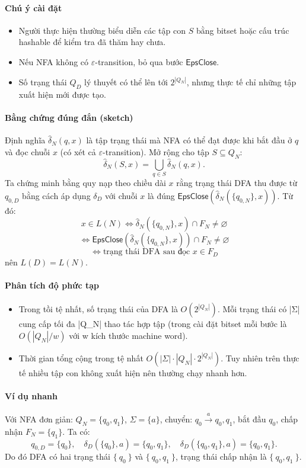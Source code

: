 \documentclass[12pt,a4paper]{report}
\begin{document}
\paragraph{Chú ý cài đặt}
\begin{itemize}
  \item Người thực hiện thường biểu diễn các tập con \(S\) bằng bitset hoặc cấu trúc hashable để kiểm tra đã thăm hay chưa.
  \item Nếu NFA không có \(\varepsilon\)-transition, bỏ qua bước \(\mathsf{EpsClose}\).
  \item Số trạng thái \(Q_D\) lý thuyết có thể lên tới \(2^{|Q_N|}\), nhưng thực tế chỉ những tập xuất hiện mới được tạo.
\end{itemize}

\paragraph{Bằng chứng đúng đắn (sketch)}  
Định nghĩa \( \hat{\delta}_N(q, x) \) là tập trạng thái mà NFA có thể đạt được khi bắt đầu ở \(q\) và đọc chuỗi \(x\) (có xét cả \(\varepsilon\)-transition). Mở rộng cho tập \(S\subseteq Q_N\):
\[
\hat{\delta}_N(S,x) = \bigcup_{q\in S} \hat{\delta}_N(q,x).
\]
Ta chứng minh bằng quy nạp theo chiều dài \(x\) rằng trạng thái DFA thu được từ \(q_{0,D}\) bằng cách áp dụng \(\delta_D\) với chuỗi \(x\) là đúng \(\mathsf{EpsClose}(\hat{\delta}_N(\{q_{0,N}\}, x))\).  
Từ đó:
\[
x \in L(N) \iff \hat{\delta}_N(\{q_{0,N}\},x) \cap F_N \neq \varnothing
\]
\[
\iff \mathsf{EpsClose}(\hat{\delta}_N(\{q_{0,N}\},x)) \cap F_N \neq \varnothing
\]
\[
\iff \text{trạng thái DFA sau đọc } x \in F_D
\]
nên \(L(D)=L(N)\).

\paragraph{Phân tích độ phức tạp}
\begin{itemize}
  \item Trong tồi tệ nhất, số trạng thái của DFA là \(O(2^{|Q_N|})\). Mỗi trạng thái có |Σ| cung cấp tối đa |Q_N| thao tác hợp tập (trong cài đặt bitset mỗi bước là \(O(|Q_N|/w)\) với w kích thước machine word).
  \item Thời gian tổng cộng trong tệ nhất \(O(|\Sigma|\cdot |Q_N|\cdot 2^{|Q_N|})\). Tuy nhiên trên thực tế nhiều tập con không xuất hiện nên thường chạy nhanh hơn.
\end{itemize}

\paragraph{Ví dụ nhanh}  
Với NFA đơn giản: \(Q_N=\{q_0,q_1\}\), \(\Sigma=\{a\}\), chuyển: \(q_0 \xrightarrow{a} q_0,q_1\), bắt đầu \(q_0\), chấp nhận \(F_N=\{q_1\}\). Ta có:
\[
q_{0,D}=\{q_0\},\quad
\delta_D(\{q_0\},a)=\{q_0,q_1\},\quad
\delta_D(\{q_0,q_1\},a)=\{q_0,q_1\}.
\]
Do đó DFA có hai trạng thái \(\{\ q_0\ \}\) và \(\{\ q_0,q_1\ \}\), trạng thái chấp nhận là \(\{\ q_0,q_1\ \}\).
\end{document}
